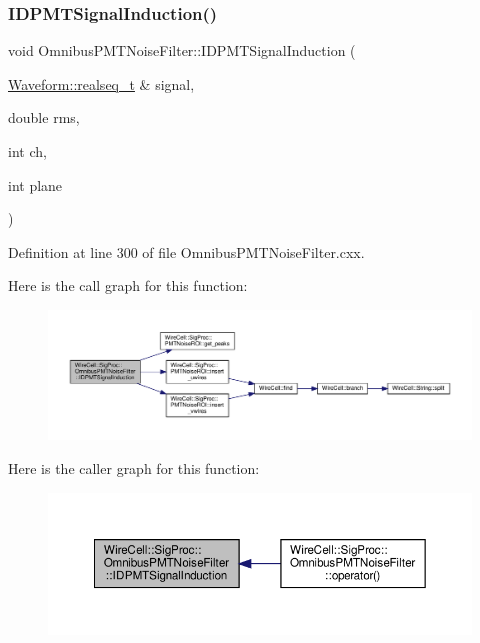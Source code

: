 \subsubsection{\texorpdfstring{I\+D\+P\+M\+T\+Signal\+Induction()}{IDPMTSignalInduction()}}
{\footnotesize\ttfamily void Omnibus\+P\+M\+T\+Noise\+Filter\+::\+I\+D\+P\+M\+T\+Signal\+Induction (\begin{DoxyParamCaption}\item[{\hyperlink{namespace_wire_cell_1_1_waveform_a479175e541c8545e87cd8063b74b6956}{Waveform\+::realseq\+\_\+t} \&}]{signal,  }\item[{double}]{rms,  }\item[{int}]{ch,  }\item[{int}]{plane }\end{DoxyParamCaption})}



Definition at line 300 of file Omnibus\+P\+M\+T\+Noise\+Filter.\+cxx.

Here is the call graph for this function\+:
\nopagebreak
\begin{figure}[H]
\begin{center}
\leavevmode
\includegraphics[width=350pt]{class_wire_cell_1_1_sig_proc_1_1_omnibus_p_m_t_noise_filter_af007f96c1c669926b51dce67928fbf60_cgraph}
\end{center}
\end{figure}
Here is the caller graph for this function\+:
\nopagebreak
\begin{figure}[H]
\begin{center}
\leavevmode
\includegraphics[width=350pt]{class_wire_cell_1_1_sig_proc_1_1_omnibus_p_m_t_noise_filter_af007f96c1c669926b51dce67928fbf60_icgraph}
\end{center}
\end{figure}
\mbox{\label{class_wire_cell_1_1_sig_proc_1_1_omnibus_p_m_t_noise_filter_ad33bf21dae5ad22503a33e6444057dcb}} 
